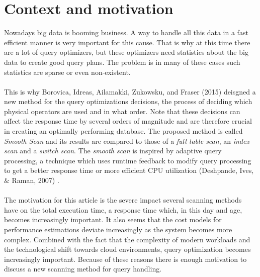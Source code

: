 \documentclass[a4paper,11pt,titlepage]{article}
\begin{document}
\section{Context and motivation}
Nowadays big data is booming business. A way to handle all this data in a fast efficient manner is very important for this cause. That is why at this time there are a lot of query optimizers, but these optimizers need statistics about the big data to create good query plans. The problem is in many of these cases such statistics are sparse or even non-existent. \\
\\
This is why Borovica, Idreas, Ailamakki, Zukowsku, and Fraser (2015) \cite{smoothscan} deisgned a new method for the query optimizations decisions, the process of deciding which physical operators are used and in what order. Note that these decisions can affect the response time by several orders of magnitude and are therefore crucial in creating an optimally performing database. The proposed method is called \emph{Smooth Scan} and its results are compared to those of a \emph{full table scan}, an \emph{index scan} and a \emph{switch scan}. The \emph{smooth scan} is inspired by adaptive query processing, a technique which uses runtime feedback to modify query processing to get a better response time or more efficient CPU utilization (Deshpande, Ives, $\&$ Raman, 2007) \cite{query}.\\
\\
The motivation for this article is the severe impact several scanning methods have on the total execution time, a response time which, in this day and age, becomes increasingly important. It also seems that the cost models for performance estimations deviate increasingly as the system becomes more complex. Combined with the fact that the complexity of modern workloads and the technological shift towards cloud environments, query optimization becomes increasingly important. Because of these reasons there is enough motivation to discuss a new scanning method for query handling.

\end{document}
